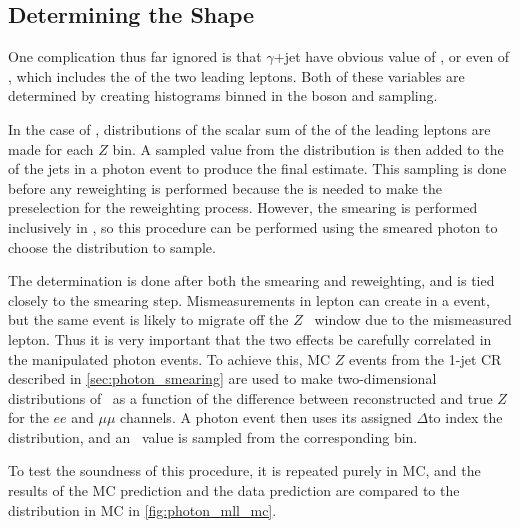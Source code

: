 \subsection{Determining the \mll Shape}
\label{sec:photon_mll}

One complication thus far ignored is that $\gamma$+jet have obvious value of \mll, or even of \HT, which includes the \pt of the two leading leptons. Both of these variables are determined by creating histograms binned in the boson \pt and sampling. 

In the case of \HT, distributions of the scalar sum of the \pt of the leading leptons are made for each $Z$ \pt bin. A sampled value from the distribution is then added to the \HT of the jets in a photon event to produce the final estimate. This sampling is done before any reweighting is performed because the \HT is needed to make the preselection for the reweighting process. However, the smearing is performed inclusively in \HT, so this procedure can be performed using the smeared photon \pt to choose the distribution to sample. 

The \mll determination is done after both the smearing and reweighting, and is tied closely to the smearing step. Mismeasurements in lepton \pt can create \met in a \dyjets event, but the same event is likely to migrate off the $Z$ \mll~window due to the mismeasured lepton. Thus it is very important that the two effects be carefully correlated in the manipulated photon events. To achieve this, \ac{MC} $Z$ events from the 1-jet \ac{CR} described in \autoref{sec:photon_smearing} are used to make two-dimensional distributions of \mll~as a function of the difference between reconstructed and true $Z$ \pt for the $ee$ and $\mu\mu$ channels. A photon event then uses its assigned $\Delta$\pt to index the distribution, and an \mll~value is sampled from the corresponding bin. 

To test the soundness of this procedure, it is repeated purely in \ac{MC}, and the results of the \ac{MC} prediction and the data prediction are compared to the \mll distribution in \dyjets \ac{MC} in \autoref{fig:photon_mll_mc}. 

